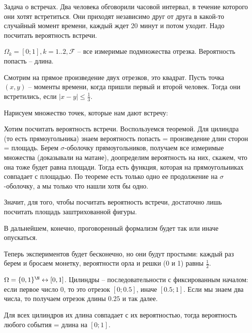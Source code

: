\begin{exmp}
Задача о встречах. Два человека обговорили часовой интервал, в течение которого они хотят встретиться. 
Они приходят независимо друг от друга в какой-то случайный момент времени, каждый ждет 20 минут и потом уходит.
Надо посчитать вероятность встречи.

$\Omega_k = [0; 1], k = 1..2, \mathcal{F}$ -- все измеримые подмножества отрезка. Вероятность попасть -- длина.

Смотрим на прямое произведение двух отрезков, это квадрат.
Пусть точка $(x, y)$ -- моменты времени, когда пришли первый и второй человек. 
Тогда они встретились, если $|x - y| \leq \frac13$. 

Нарисуем множество точек, которые нам дают встречу:


Хотим посчитать вероятность встречи. Воспользуемся теоремой. Для цилиндра (то есть прямоугольника) знаем вероятность попасть = произведение длин сторон = площадь.
Берем $\sigma$-оболочку прямоугольников, получаем все измеримые множества (доказывали на матане), доопределим вероятность на них, скажем, что она тоже будет равна площади. 
Тогда есть функция, которая на прямоугольниках совпадает с площадью. 
По теореме есть только одно ее продолжение на $\sigma$-оболочку, а мы только что нашли хотя бы одно.

Значит, для того, чтобы посчитать вероятность встречи, достаточно лишь посчитать площадь заштрихованной фигуры.
\end{exmp}

\begin{Rem}
В дальнейшем, конечно, проговоренный формализм будет так или иначе опускаться.
\end{Rem}

\begin{exmp}
Теперь экспериментов будет бесконечно, но они будут простыми: каждый раз берем и бросаем монетку, вероятности орла и решки (0 и 1) равны $\frac12$.

$\Omega = \{0, 1\}^{\N} \leftrightarrow [0, 1]$.
Цилиндры -- последовательности с фиксированным началом: если первое число 0, то это отрезок $[0; 0.5]$, иначе $[0.5; 1]$.
Если мы знаем два числа, то получаем отрезок длины $0.25$ и так далее.

Для всех цилиндров их длина совпадает с их вероятностью, тогда вероятность любого события = длина на $[0; 1]$.
\end{exmp}

